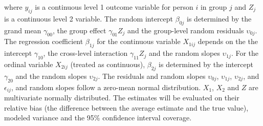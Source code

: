 \documentclass[10pt, a4paper, titlepage]{article}
\begin{document}
where $y_{ij}$ is a continuous level 1 outcome variable for person $i$ in group $j$ and $Z_j$ is a continuous level 2 variable. The random intercept $\beta_{0j}$ is determined by the grand mean $\gamma_{00}$, the group effect $\gamma_{01}Z_{j}$ and the group-level random residuals $\upsilon_{0j}$. The regression coefficient $\beta_{1j}$ for the continuous variable $X_{1ij}$ depends on the the intercept $\gamma_{10}$, the cross-level interaction $\gamma_{11}Z_{j}$ and the random slopes $\upsilon_{1j}$. For the ordinal variable $X_{2ij}$ (treated as continuous), $\beta_{2j}$ is determined by the intercept $\gamma_{20}$ and the random slopes $\upsilon_{2j}$. The residuals and random slopes $\upsilon_{0j}$, $\upsilon_{1j}$,  $\upsilon_{2j}$, and $\epsilon_{ij}$, and random slopes follow a zero-mean normal distribution. $X_1$, $X_2$ and $Z$ are multivariate normally distributed. The estimates will be evaluated on their relative bias (the difference between the average estimate and the true value), modeled variance and the 95\% confidence interval coverage.

\nocite{*}
\newpage


\end{document}
